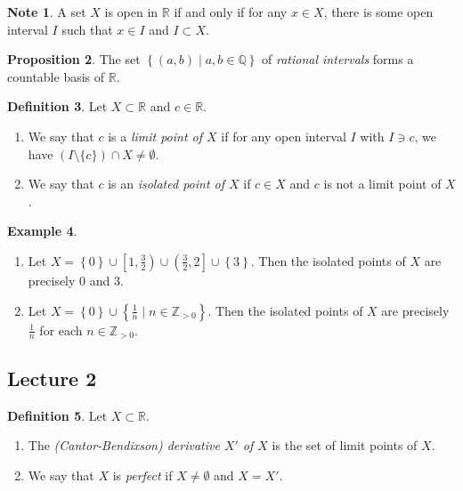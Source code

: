 \documentclass[10pt,letterpaper,cm]{nupset}
\theoremstyle{definition}
\newtheorem{definition}{Definition}[subsection]
\newtheorem{exmp}[definition]{Example}
\newtheorem{note}[definition]{Note}
\theoremstyle{theorem}
\newtheorem{prop}[definition]{Proposition}
\theoremstyle{remark}
\newcommand{\Q}{\mathbb Q}
\newcommand{\R}{\mathbb R}
\newcommand{\Z}{\mathbb Z}
\newcommand{\1}{\mathbf{1}}
\newcommand{\0}{\vec 0}
\begin{document}
\begin{note}
A set $X$ is open in $\R$ if and only if for any $x\in X$, there is some open interval $I$ such that  $x\in I$ and $I \subset X$.  
\end{note}

\begin{prop}
The set $\left\{(a,b) \mid a, b\in \Q\right\}$ of \textit{rational intervals} forms a countable basis of $\R$.
\end{prop}

\begin{definition} Let $X\subset \R$ and $c\in \R$.
\begin{enumerate}
\item We say that $c$ is a \textit{limit point of $X$} if for any open interval $I$ with $I\ni c$, we have $\left(I\setminus \{c\}\right) \cap X \ne \emptyset$.
\item We say that $c$ is an \textit{isolated point of $X$} if $c\in X$ and $c$ is not a limit point of $X$.
\end{enumerate}
\end{definition}

\begin{exmp} $ $
\begin{enumerate}
\item Let $X = \left\{0\right\} \cup \left[1, \frac{3}{2}\right) \cup \left(\frac{3}{2}, 2\right] \cup \left\{3\right\}$. Then the isolated points of $X$ are precisely $0$ and $3$. 
\item Let $X = \left\{0\right\} \cup \left\{\frac{1}{n} \mid n \in \Z_{>0}\right\}$. Then the isolated points of $X$ are precisely $\frac{1}{n}$ for each $n\in \Z_{>0}$.
\end{enumerate}
\end{exmp}

\subsection{Lecture 2}

\begin{definition} Let $X\subset \R$. 
\begin{enumerate} 
\item The \textit{(Cantor-Bendixson) derivative $X'$ of $X$} is the set of limit points of $X$. 
\item We say that $X$ is \textit{perfect} if $X \ne \emptyset$ and $X = X'$.
\end{enumerate}
\end{definition}
\end{document}
